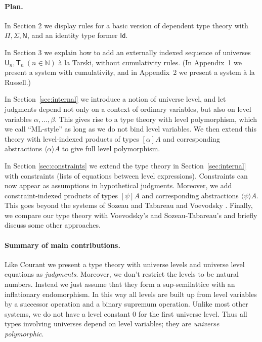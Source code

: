 \documentclass[11pt,a4paper]{article}
\theoremstyle{definition}
\newcommand{\Id}{\mathsf{Id}}
\newcommand{\NN}{\mathsf{N}}
\newcommand{\Nat}{\mathbb{N}}
\newcommand{\UU}{\mathsf{U}}
\newcommand{\lam}[1]{{\langle}#1{\rangle}}
\newcommand{\T}{\mathsf{T}}
\begin{document}
\paragraph{Plan.}
In Section 2 we display rules for a basic version of dependent type theory with
$\Pi, \Sigma, \NN$, and an identity type former $\Id$.

In Section 3 we explain how to add an externally indexed sequence of universes
$\UU_n, \T_n~(n\in\Nat)$ \`a la Tarski, without cumulativity rules.
(In Appendix~1 we present a system with cumulativity,
and in Appendix~2 we present a system \`a la Russell.)

In Section~\ref{sec:internal} we introduce a notion of universe level,
and let judgments depend not only on a context of ordinary variables,
but also on level variables $\alpha, \ldots, \beta$.
This gives rise to a type theory with level polymorphism, which we call
``ML-style'' as long as we do not bind level variables.
We then extend this theory with level-indexed products of
types $[\alpha]A$ and corresponding abstractions $\lam{\alpha}A$
to give full level polymorphism.

In Section \ref{sec:constraints} we extend the type theory in
Section~\ref{sec:internal} with constraints (lists of equations between level expressions). Constraints can now appear as assumptions in hypothetical judgments. Moreover, we add
constraint-indexed products of types $[\psi]A$ and corresponding
abstractions $\lam{\psi}A$. This goes beyond the systems of Sozeau and Tabareau \cite{SozeauTabareau:coq} and Voevodsky \cite{VV}.
Finally, we %
compare our type theory with Voevodsky's and Sozeau-Tabareau's
and briefly discuss some other approaches.


\paragraph{Summary of main contributions.}
Like Courant we present a type theory with
universe levels  and universe level equations as \emph{judgments}. Moreover, we don't restrict the levels to be natural numbers. Instead we just assume that they form a sup-semilattice with an inflationary endomorphism. In this way all levels are built up from level variables by a successor operation and a binary supremum operation. Unlike most other systems, we do not have a level constant $0$ for the first universe level. Thus all types involving universes depend on level variables; they are {\em universe polymorphic}.
\end{document}
